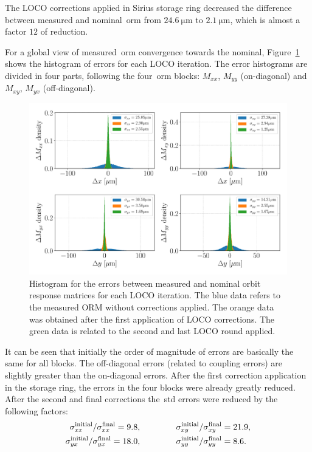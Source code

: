 The LOCO corrections applied in Sirius storage ring decreased the difference between measured and nominal~\gls{orm} from $\SI{24.6}{\micro\meter}$ to $\SI{2.1}{\micro\meter}$, which is almost a factor $12$ of reduction.

For a global view of measured~\gls{orm} convergence towards the nominal, Figure~\ref{fig:histogram} shows the histogram of errors for each LOCO iteration. The error histograms are divided in four parts, following the four~\gls{orm} blocks: $M_{xx}$, $M_{yy}$ (on-diagonal) and $M_{xy}$, $M_{yx}$ (off-diagonal). 
\begin{figure}[h!]
\centering
\includegraphics[width=1.0\textwidth]{figures/histogram_loco_iterations3_density.pdf}
\caption{Histogram for the errors between measured and nominal orbit response matrices for each LOCO iteration. The blue data refers to the measured ORM without corrections applied. The orange data was obtained after the first application of LOCO corrections. The green data is related to the second and last LOCO round applied.}
\label{fig:histogram}
\end{figure}

It can be seen that initially the order of magnitude of errors are basically the same for all blocks. The off-diagonal errors (related to coupling errors) are slightly greater than the on-diagonal errors. After the first correction application in the storage ring, the errors in the four blocks were already greatly reduced. After the second and final corrections the~\gls{std} errors were reduced by the following factors: 
\begin{align*}
    \sigma_{xx}^{\mathrm{initial}}/\sigma_{xx}^{\mathrm{final}} = 9.8, & \hspace{1.5cm} \sigma_{xy}^{\mathrm{initial}}/\sigma_{xy}^{\mathrm{final}} = 21.9, \\
    \sigma_{yx}^{\mathrm{initial}}/\sigma_{yx}^{\mathrm{final}} = 18.0, & \hspace{1.5cm}
    \sigma_{yy}^{\mathrm{initial}}/\sigma_{yy}^{\mathrm{final}} = 8.6. 
\end{align*}

